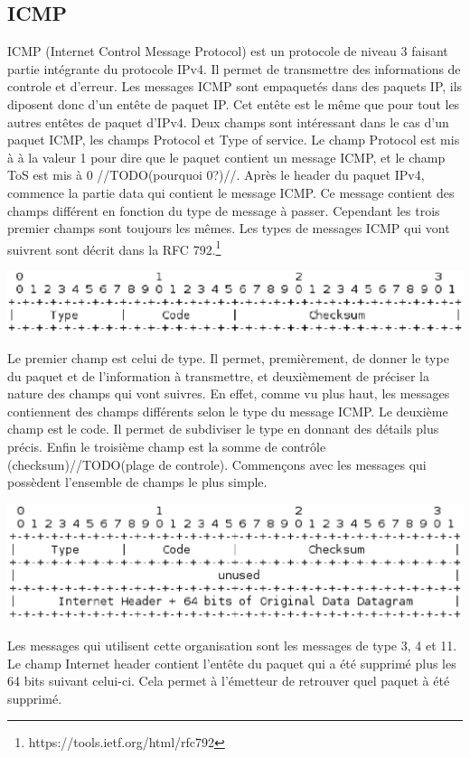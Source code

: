 \subsection{ICMP} ICMP (Internet Control Message Protocol) est un protocole de
niveau 3 faisant partie intégrante du protocole IPv4. Il permet de transmettre
des informations de controle et d'erreur. Les messages ICMP sont empaquetés
dans des paquets IP, ils diposent donc d'un entête de paquet IP. Cet entête est
le même que pour tout les autres entêtes de paquet d'IPv4. Deux champs sont
intéressant dans le cas d'un paquet ICMP, les champs Protocol et Type of
service. Le champ Protocol est mis à à la valeur 1 pour dire que le paquet
contient un message ICMP, et le champ ToS est mis à 0 //TODO(pourquoi 0?)//.
Après le header du paquet IPv4, commence la partie data qui contient le message
ICMP. Ce message contient des champs différent en fonction du type de message à
passer. Cependant les trois premier champs sont toujours les mêmes.  Les types
de messages ICMP qui vont suivrent sont décrit dans la RFC
792.\footnote{https://tools.ietf.org/html/rfc792}

\includegraphics[width=15cm]{./pics/header.eps}

Le premier champ est celui de type. Il permet, premièrement, de donner le type
du paquet et de l'information à transmettre, et deuxièmement de préciser la
nature des champs qui vont suivres. En effet, comme vu plus haut, les messages
contiennent des champs différents selon le type du message ICMP.
Le deuxième champ est le code. Il permet de subdiviser le type en donnant des détails plus
précis. Enfin le troisième champ est la somme de contrôle
(checksum)//TODO(plage de controle).  Commençons avec les messages qui
possèdent l'ensemble de champs le plus simple.

\includegraphics[width=15cm]{./pics/header1.eps}


Les messages qui utilisent cette organisation sont les messages de type 3, 4
et 11.
Le champ Internet header contient l'entête du paquet qui a été supprimé plus
les 64 bits suivant celui-ci. Cela permet à l'émetteur de retrouver quel paquet
à été supprimé.


